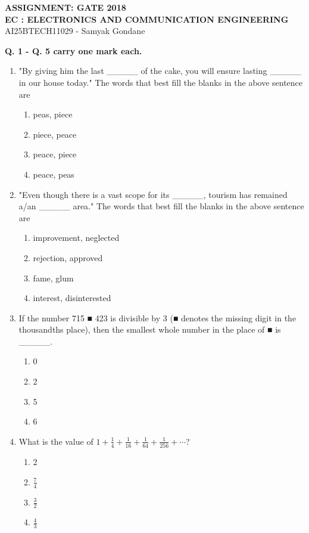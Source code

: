 \documentclass{article}
\begin{document}
\begin{center}
\large
    \textbf{ASSIGNMENT: GATE 2018 \\ EC : ELECTRONICS AND COMMUNICATION ENGINEERING}\\
    AI25BTECH11029 - Samyak Gondane
\end{center}

\textbf{Q. 1 - Q. 5 carry one mark each.}

\begin{enumerate}
\item "By giving him the last \_\_\_\_\_ of the cake, you will ensure lasting \_\_\_\_\_ in our house today." The words that best fill the blanks in the above sentence are
\begin{multicols}{4}
\begin{enumerate}
\item peas, piece
\item piece, peace
\item peace, piece
\item peace, peas
\end{enumerate}
\end{multicols}

\item "Even though there is a vast scope for its \_\_\_\_\_, tourism has remained a/an \_\_\_\_\_ area." The words that best fill the blanks in the above sentence are
\begin{enumerate}
\item improvement, neglected
\item rejection, approved
\item fame, glum
\item interest, disinterested
\end{enumerate}

\item If the number 715 ■ 423 is divisible by 3 (■ denotes the missing digit in the thousandths place), then the smallest whole number in the place of ■ is \_\_\_\_\_.
\begin{multicols}{4}
\begin{enumerate}
\item 0
\item 2
\item 5
\item 6
\end{enumerate}
\end{multicols}

\item What is the value of $1 + \frac{1}{4} + \frac{1}{16} + \frac{1}{64} + \frac{1}{256} + \cdots$?
\begin{multicols}{4}
\begin{enumerate}
\item 2
\item $\frac{7}{4}$
\item $\frac{3}{2}$
\item $\frac{4}{3}$
\end{enumerate}
\end{multicols}


\end{enumerate}
\end{document}
